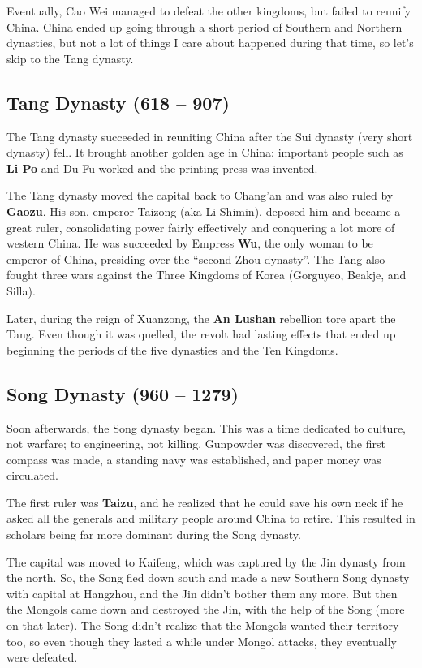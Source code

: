 Eventually, Cao Wei managed to defeat the other kingdoms, but failed to reunify China.
China ended up going through a short period of Southern and Northern dynasties,
but not a lot of things I care about happened during that time, so let's skip to the Tang dynasty.

\subsection*{Tang Dynasty (618 -- 907)}

The Tang dynasty succeeded in reuniting China after the Sui dynasty (very short dynasty) fell.
It brought another golden age in China:
important people such as \textbf{Li Po} and Du Fu worked and the printing press was invented.

The Tang dynasty moved the capital back to Chang'an and was also ruled by \textbf{Gaozu}.
His son, emperor Taizong (aka Li Shimin), deposed him and became a great ruler,
consolidating power fairly effectively and conquering a lot more of western China.
He was succeeded by Empress \textbf{Wu}, the only woman to be emperor of China,
presiding over the ``second Zhou dynasty''.
The Tang also fought three wars against the Three Kingdoms of Korea (Gorguyeo, Beakje, and Silla).

Later, during the reign of Xuanzong, the \textbf{An Lushan} rebellion tore apart the Tang.
Even though it was quelled, the revolt had lasting effects that ended up beginning the
periods of the five dynasties and the Ten Kingdoms.

\subsection*{Song Dynasty (960 -- 1279)}

Soon afterwards, the Song dynasty began.
This was a time dedicated to culture, not warfare; to engineering, not killing.
Gunpowder was discovered, the first compass was made,
a standing navy was established, and paper money was circulated.

The first ruler was \textbf{Taizu}, and he realized that he could save his own neck if he
asked all the generals and military people around China to retire.
This resulted in scholars being far more dominant during the Song dynasty.

The capital was moved to Kaifeng, which was captured by the Jin dynasty from the north.
So, the Song fled down south and made a new Southern Song dynasty with capital at Hangzhou,
and the Jin didn't bother them any more.
But then the Mongols came down and destroyed the Jin,
with the help of the Song (more on that later).
The Song didn't realize that the Mongols wanted their territory too,
so even though they lasted a while under Mongol attacks, they eventually were defeated.

